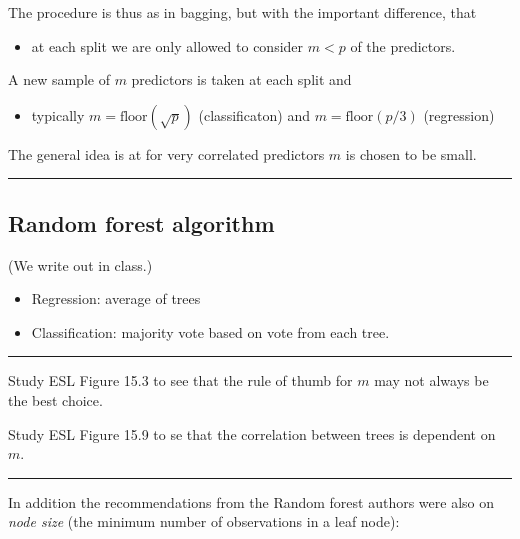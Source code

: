 \documentclass[
  letterpaper,
  DIV=11,
  numbers=noendperiod]{scrartcl}
\providecommand{\tightlist}{%
  \setlength{\itemsep}{0pt}\setlength{\parskip}{0pt}}\usepackage{longtable,booktabs,array}
\begin{document}
The procedure is thus as in bagging, but with the important difference,
that

\begin{itemize}
\tightlist
\item
  at each split we are only allowed to consider \(m<p\) of the
  predictors.
\end{itemize}

A new sample of \(m\) predictors is taken at each split and

\begin{itemize}
\tightlist
\item
  typically \(m= \text{floor}(\sqrt p)\) (classificaton) and
  \(m=\text{floor}(p/3)\) (regression)
\end{itemize}

The general idea is at for very correlated predictors \(m\) is chosen to
be small.

\begin{center}\rule{0.5\linewidth}{0.5pt}\end{center}

\hypertarget{random-forest-algorithm}{%
\subsection{Random forest algorithm}\label{random-forest-algorithm}}

(We write out in class.)

\begin{itemize}
\tightlist
\item
  Regression: average of trees
\item
  Classification: majority vote based on vote from each tree.
\end{itemize}

\begin{center}\rule{0.5\linewidth}{0.5pt}\end{center}

Study ESL Figure 15.3 to see that the rule of thumb for \(m\) may not
always be the best choice.

Study ESL Figure 15.9 to se that the correlation between trees is
dependent on \(m\).

\begin{center}\rule{0.5\linewidth}{0.5pt}\end{center}

In addition the recommendations from the Random forest authors were also
on \emph{node size} (the minimum number of observations in a leaf node):
\end{document}
